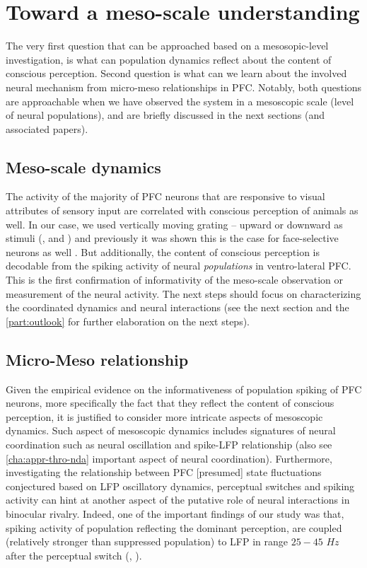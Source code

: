 \section{Toward a meso-scale understanding}
The very first question that can be approached based on a mesosopic-level investigation,
is  what can population dynamics  reflect about the content of conscious perception.
Second question is what can we learn about the involved neural mechanism from micro-meso relationships in PFC.
Notably, both questions are approachable when we have observed the system in a mesoscopic scale
(level of neural populations), and are briefly discussed in the next sections (and associated papers).

\subsection{Meso-scale dynamics} %

The activity of the majority of PFC neurons that are responsive to visual attributes of sensory input
are correlated with conscious perception of animals as well.
In our case, we used vertically moving grating  -- upward or downward as stimuli \cite{safaviNonmonotonicSpatialStructure2018,kapoorDecodingInternallyGenerated2022}
(\seealsos,  and )
and previously it was shown this is the case for face-selective neurons as well \cite{panagiotaropoulosNeuronalDischargesGamma2012}.
But additionally, the content of conscious perception is decodable from the spiking activity of neural \emph{populations} in ventro-lateral PFC.
This is the first confirmation of informativity of the meso-scale observation or measurement of the neural activity.
The next steps should focus on characterizing the coordinated dynamics and neural interactions 
(see the next section and the \autoref{part:outlook} for further elaboration on the next steps).


\subsection{Micro-Meso relationship} %
Given the empirical evidence on the informativeness of population spiking of PFC neurons,
more specifically the fact that they reflect the content of conscious perception,
it is justified to consider more intricate aspects of mesoscopic dynamics.
Such aspect of mesoscopic dynamics includes signatures of neural coordination such as neural oscillation and spike-LFP relationship 
(also see \autoref{cha:appr-thro-nda} important aspect of neural coordination).
Furthermore, investigating the relationship between PFC [presumed] state fluctuations conjectured based on LFP oscillatory dynamics,
perceptual switches and spiking activity can hint at another aspect of the putative role of neural interactions in binocular rivalry.
Indeed, one of the important findings of our study was that,
spiking activity of population reflecting the dominant perception,
are coupled (relatively stronger than suppressed population) to LFP in range $25-45$ $Hz$ after the perceptual switch \cite{dwarakanathBistabilityPrefrontalStates2023}
(\seealso, ).

